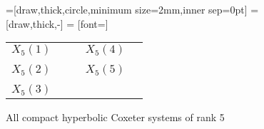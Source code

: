\begin{figure}
	\centering
	=[draw,thick,circle,minimum size=2mm,inner sep=0pt]
	 = [draw,thick,-]
	 = [font=\small]

	\begin{tabular}{MMcMM}
		$X_5(1)$ & \comphyperfiveone & \hspace*{\cgpadh} & $X_5(4)$ & \comphyperfivefour \\ \vspace*{\cgpadv} \\
		$X_5(2)$ & \comphyperfivetwo & \hspace*{\cgpadh} & $X_5(5)$ & \comphyperfivefive \\ \vspace*{\cgpadv} \\
		$X_5(3)$ & \comphyperfivethree
	\end{tabular}
	\caption{All compact hyperbolic Coxeter systems of rank 5}
	\label{fig:compact-hyperbolic-coxeter-systems-5}
\end{figure}